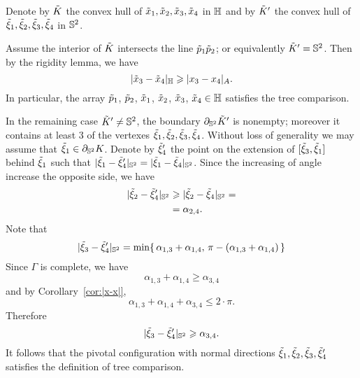 Denote by $\~K$ the convex hull of $\~x_1,\~x_2,\~x_3,\~x_4$ in $\HH$
and by $\~K'$ the convex hull of $\~\xi_1,\~\xi_2,\~\xi_3,\~\xi_4$ in $\SS^2$.


Assume the interior of $\~K$ intersects the line $\~p_1\~p_2$;
or equivalently $\~K'=\SS^2$.
Then by the rigidity lemma, we have 
\[|\~x_3-\~x_4|_\HH\ge|x_3-x_4|_A.\]
In particular, the array $\~p_1$, $\~p_2$, $\~x_1$, $\~x_2$, $\~x_3$, $\~x_4\in \HH$ satisfies the tree comparison.



In the remaining case $\~K'\ne \SS^2$, the boundary $\partial_{\SS^2}\~K'$ is nonempty; moreover it contains at least 3 of the vertexes $\~\xi_1,\~\xi_2,\~\xi_3,\~\xi_4$.
Without loss of generality we may assume that $\~\xi_1\in \partial_{\SS^2}K$.
Denote by $\~\xi_4'$ the point on the extension of $[\~\xi_3,\~\xi_1]$ behind $\~\xi_1$ such that $|\~\xi_1-\~\xi_4'|_{\SS^2}=|\~\xi_1-\~\xi_4|_{\SS^2}$.
Since the increasing of angle increase the opposite side, we have
\begin{align*}
|\~\xi_2-\~\xi_4'|_{\SS^2}&\ge|\~\xi_2-\~\xi_4|_{\SS^2}=
\\
&=\alpha_{2,4}.
\end{align*}
Note that 
\[
|\~\xi_3-\~\xi_4'|_{\SS^2}=\min\{\,\alpha_{1,3}+\alpha_{1,4},\,\pi-(\alpha_{1,3}+\alpha_{1,4})\,\} 
\]
Since $\Gamma$ is complete, we have 
\[\alpha_{1,3}+\alpha_{1,4}\ge \alpha_{3,4}\]
and by Corollary~\ref{cor:|x-x|},
\[\alpha_{1,3}+\alpha_{1,4}+\alpha_{3,4}\le 2\cdot\pi.\]
Therefore 
\[
|\~\xi_3-\~\xi_4'|_{\SS^2}\ge \alpha_{3,4}.
\]
It follows that the pivotal configuration with normal directions $\~\xi_1,\~\xi_2,\~\xi_3,\~\xi_4'$ satisfies the definition of tree comparison.
\qeds



